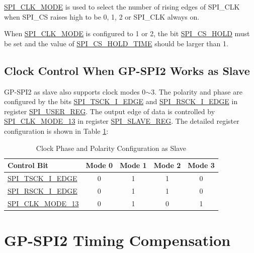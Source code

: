\documentclass[main\_\_EN.tex]{subfiles}
\begin{document}
\hyperref[fielddesc:SPICLKMODE]{SPI\_CLK\_MODE} is used to select the number of rising edges of SPI\_CLK when SPI\_CS raises high to be 0, 1, 2 or SPI\_CLK always on. 

\begin{tiplisting}
 When \hyperref[fielddesc:SPICLKMODE]{SPI\_CLK\_MODE} is configured to 1 or 2, the bit \hyperref[fielddesc:SPICSHOLD]{SPI\_CS\_HOLD} must be set and the value of \hyperref[fielddesc:SPICSHOLDTIME]{SPI\_CS\_HOLD\_TIME} should be larger than 1.
\end{tiplisting}
\vspace{-1em}

\subsection{Clock Control When GP-SPI2 Works as Slave}\label{sec:gp-spi-slave-clock-control}

GP-SPI2 as slave also supports clock modes 0$\sim$3. The polarity and phase are configured by the bits \hyperref[fielddesc:SPITSCKIEDGE]{SPI\_TSCK\_I\_EDGE} and \hyperref[fielddesc:SPIRSCKIEDGE]{SPI\_RSCK\_I\_EDGE} in register \hyperref[regdesc:SPIUSERREG]{SPI\_USER\_REG}. The output edge of data is controlled by \hyperref[fielddesc:SPICLKMODE13]{SPI\_CLK\_MODE\_13} in register \hyperref[regdesc:SPISLAVEREG]{SPI\_SLAVE\_REG}. The detailed register configuration is shown in Table \ref{tab:clock-pol-slave}: 

\begin{table}[H]
    \centering
    \caption{Clock Phase and Polarity Configuration as Slave}
    \label{tab:clock-pol-slave}
    \begin{tabular}[c]{|p{3.5cm}|c|c|c|c|}
    \hline
    \rowcolor{lightgray}
    \textbf{Control Bit} & \textbf{Mode 0} & \textbf{Mode 1} & \textbf{Mode 2} & \textbf{Mode 3}\\
    \hline
   \hyperref[fielddesc:SPITSCKIEDGE]{SPI\_TSCK\_I\_EDGE}   & 0 & 1 & 1 & 0\\
    \hline
   \hyperref[fielddesc:SPIRSCKIEDGE]{SPI\_RSCK\_I\_EDGE}   & 0 & 1 & 1 & 0\\
    \hline
   \hyperref[fielddesc:SPICLKMODE13]{SPI\_CLK\_MODE\_13}     & 0 & 1 & 0 & 1\\
    \hline    
    \end{tabular}
\end{table}


\section{GP-SPI2 Timing Compensation} \label{sec:gp-spi-timing-compensation}
\end{document}
